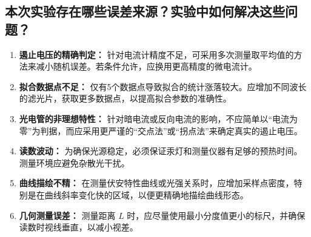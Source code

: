 \documentclass{../template/Report}%
\begin{document}
\begin{fullreportonly}
\subsection{本次实验存在哪些误差来源？实验中如何解决这些问题？}
\begin{enumerate}
    \item \textbf{遏止电压的精确判定：} 针对电流计精度不足，可采用多次测量取平均值的方法来减小随机误差。若条件允许，应换用更高精度的微电流计。
    \item \textbf{拟合数据点不足：} 仅有5个数据点导致拟合的统计涨落较大。应增加不同波长的滤光片，获取更多数据点，以提高拟合参数的准确性。
    \item \textbf{光电管的非理想特性：} 针对暗电流或反向电流的影响，不应简单以“电流为零”为判据，而应采用更严谨的“交点法”或“拐点法”来确定真实的遏止电压。
    \item \textbf{读数波动：} 为确保光源稳定，必须保证汞灯和测量仪器有足够的预热时间。测量环境应避免杂散光干扰。
    \item \textbf{曲线描绘不精：} 在测量伏安特性曲线或光强关系时，应增加采样点密度，特别是在曲线斜率变化快的区域，以便更精确地描绘曲线形态。
    \item \textbf{几何测量误差：} 测量距离 $L$ 时，应尽量使用最小分度值更小的标尺，并确保读数时视线垂直，以减小视差。
\end{enumerate}
\end{fullreportonly}
\insertnotes
\end{document}
